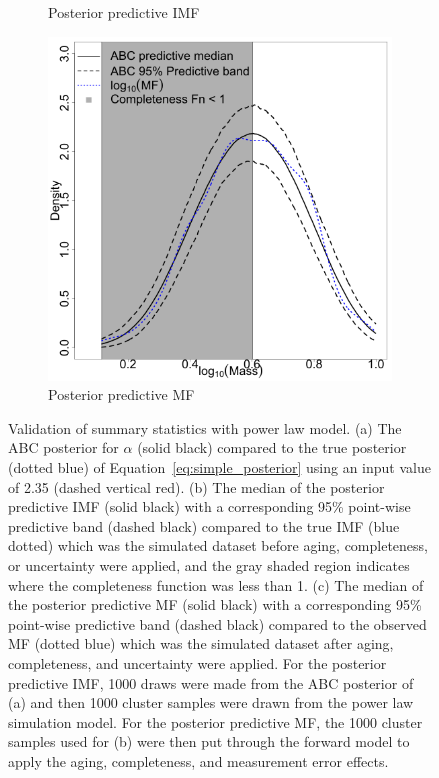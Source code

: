 \documentclass[ejs]{imsart}
\numberwithin{equation}{section}
\theoremstyle{plain}
\begin{document}
\begin{figure}[htbp]
\begin{subfigure}{0.32\textwidth}
\caption{Posterior predictive IMF}\label{subfig:basic_imf}
\end{subfigure}
\begin{subfigure}{0.32\textwidth}
\centering
\includegraphics[width=\textwidth]{figures/basic_1_1000_predictive_mf.png}
\caption{Posterior predictive MF}\label{subfig:basic_mf}
\end{subfigure}        
   \caption{Validation of summary statistics with power law model.  (a) The ABC posterior for $\alpha$ (solid black) compared to the true posterior (dotted blue) of Equation~\eqref{eq:simple_posterior} using an input value of 2.35 (dashed vertical red).  (b) The median of the posterior predictive IMF (solid black) with a corresponding 95\% point-wise predictive band (dashed black) compared to the true IMF (blue dotted) which was the simulated dataset before aging, completeness, or uncertainty were applied, and the gray shaded region indicates where the completeness function was less than 1.  (c) The median of the posterior predictive MF (solid black) with a corresponding 95\% point-wise predictive band (dashed black) compared to the observed MF (dotted blue) which was the simulated dataset after aging, completeness, and uncertainty were applied.  For the posterior predictive IMF, 1000 draws were made from the ABC posterior of (a) and then 1000 cluster samples were drawn from the power law simulation model.  For the posterior predictive MF, the 1000 cluster samples used for (b) were then put through the forward model to apply the aging, completeness, and measurement error effects.
} \label{fig:abc_simple}
\end{figure}
\end{document}
